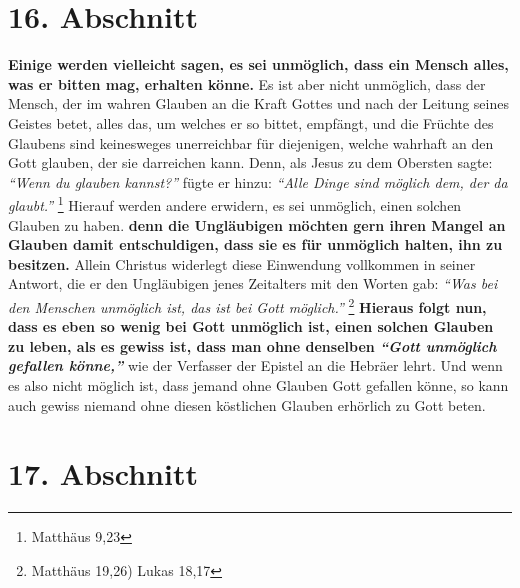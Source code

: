 \section{16. Abschnitt} \label{kap6_ab16}

\label{ref:06_14_gebetserfuellung}
\textbf{Einige werden vielleicht sagen, es sei unmöglich, dass ein Mensch alles,
was er
bitten mag, erhalten könne.} Es ist aber nicht unmöglich, dass der Mensch, der
im
wahren Glauben an die Kraft Gottes und nach der Leitung seines Geistes betet,
alles das, um welches er so bittet, empfängt, und die Früchte des Glaubens sind
keinesweges unerreichbar für diejenigen, welche wahrhaft an den Gott glauben,
der sie darreichen kann. Denn, als Jesus zu dem Obersten sagte:
\textit{"`Wenn du glauben kannst?"'} fügte er hinzu: \textit{"`Alle Dinge sind
möglich dem, der da glaubt."'}
\footnote{Matthäus 9,23}
Hierauf werden andere erwidern, es sei
unmöglich, einen solchen Glauben zu haben. \textbf{denn die Ungläubigen möchten
gern
ihren Mangel an Glauben  damit entschuldigen, dass
sie es für unmöglich halten,
ihn zu besitzen.} Allein Christus widerlegt diese Einwendung vollkommen in
seiner
Antwort, die er den Ungläubigen jenes Zeitalters mit den Worten gab:
\textit{"`Was bei den Menschen unmöglich ist, das ist bei Gott möglich."'}
\footnote{Matthäus 19,26) Lukas 18,17}
\textbf{Hieraus folgt nun, dass es eben so wenig bei Gott unmöglich
ist,
einen solchen Glauben zu leben, als es gewiss ist, dass man ohne denselben
\textit{"`Gott unmöglich gefallen könne,"'}} wie der Verfasser der Epistel an
die Hebräer
lehrt. Und wenn es also nicht möglich ist, dass jemand ohne Glauben Gott
gefallen könne, so kann auch gewiss niemand ohne diesen köstlichen Glauben
erhörlich zu Gott beten.

\section{17. Abschnitt} \label{kap6_ab17}

